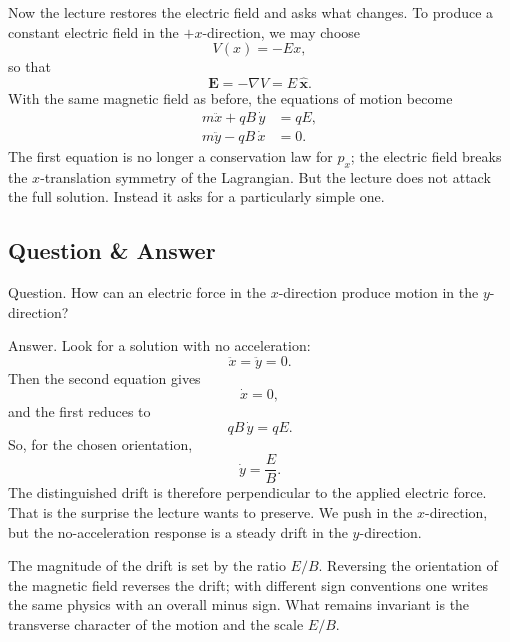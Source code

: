 Now the lecture restores the electric field and asks what changes. To produce a constant electric field in the \(+x\)-direction, we may choose
\begin{equation}
V(x)=-Ex,
\end{equation}
so that
\begin{equation}
\mathbf E=-\nabla V=E\,\hat{\mathbf x}.
\end{equation}
With the same magnetic field as before, the equations of motion become
\begin{align}
m\ddot x+qB\,\dot y &= qE, \\
m\ddot y-qB\,\dot x &= 0.
\end{align}
The first equation is no longer a conservation law for \(p_x\); the electric field breaks the \(x\)-translation symmetry of the Lagrangian. But the lecture does not attack the full solution. Instead it asks for a particularly simple one.

\subsection{Question \& Answer}

Question. How can an electric force in the \(x\)-direction produce motion in the \(y\)-direction?

Answer. Look for a solution with no acceleration:
\begin{equation}
\ddot x=\ddot y=0.
\end{equation}
Then the second equation gives
\begin{equation}
\dot x=0,
\end{equation}
and the first reduces to
\begin{equation}
qB\,\dot y=qE.
\end{equation}
So, for the chosen orientation,
\begin{equation}
\dot y=\frac{E}{B}.
\end{equation}
The distinguished drift is therefore perpendicular to the applied electric force. That is the surprise the lecture wants to preserve. We push in the \(x\)-direction, but the no-acceleration response is a steady drift in the \(y\)-direction.

The magnitude of the drift is set by the ratio \(E/B\). Reversing the orientation of the magnetic field reverses the drift; with different sign conventions one writes the same physics with an overall minus sign. What remains invariant is the transverse character of the motion and the scale \(E/B\).

